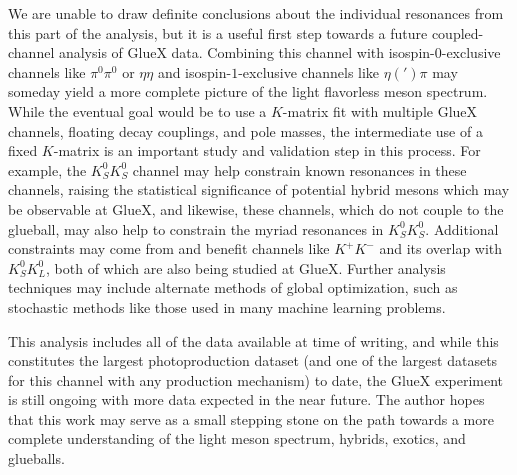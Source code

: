 We are unable to draw definite conclusions about the individual resonances from this part of the analysis, but it is a useful first step towards a future coupled-channel analysis of GlueX data. Combining this channel with isospin-$0$-exclusive channels like $\pi^0\pi^0$ or $\eta\eta$ and isospin-$1$-exclusive channels like $\eta(')\pi$ may someday yield a more complete picture of the light flavorless meson spectrum. While the eventual goal would be to use a $K$-matrix fit with multiple GlueX channels, floating decay couplings, and pole masses, the intermediate use of a fixed $K$-matrix is an important study and validation step in this process. For example, the $K_S^0K_S^0$ channel may help constrain known resonances in these channels, raising the statistical significance of potential hybrid mesons which may be observable at GlueX, and likewise, these channels, which do not couple to the glueball, may also help to constrain the myriad resonances in $K_S^0K_S^0$. Additional constraints may come from and benefit channels like $K^+K^-$ and its overlap with $K_S^0K_L^0$, both of which are also being studied at GlueX. Further analysis techniques may include alternate methods of global optimization, such as stochastic methods like those used in many machine learning problems.

This analysis includes all of the data available at time of writing, and while this constitutes the largest photoproduction dataset (and one of the largest datasets for this channel with any production mechanism) to date, the GlueX experiment is still ongoing with more data expected in the near future. The author hopes that this work may serve as a small stepping stone on the path towards a more complete understanding of the light meson spectrum, hybrids, exotics, and glueballs.
